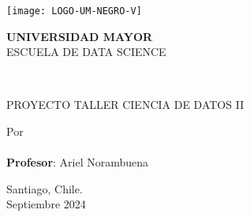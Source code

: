 \thispagestyle{empty}
\begin{center}
\singlespace
    \texttt{[image: LOGO-UM-NEGRO-V]}\\
    \vspace{0.8cm}
    \begin{large}
        \textbf{UNIVERSIDAD MAYOR}\\
        \vspace{0.3cm}
        ESCUELA DE DATA SCIENCE\\
        \vspace{1.6cm}
    \end{large}
    \begin{large}
        \textbf{\MakeUppercase{\newtitle}}\\
        \vspace{1.6cm}
    \end{large}
    \begin{large}
        PROYECTO TALLER CIENCIA DE DATOS II\\
        \vspace{1cm}

        Por\\
        \vspace{1cm}\textbf{\MakeUppercase{\newauthor}}\\
        \vspace{1.4cm}
        \textbf{Profesor}:  Ariel Norambuena \\ %
        \vspace{0.6cm}

        \vspace{1cm}
        Santiago, Chile.\\
        Septiembre 2024 %
    \end{large}
\end{center}
